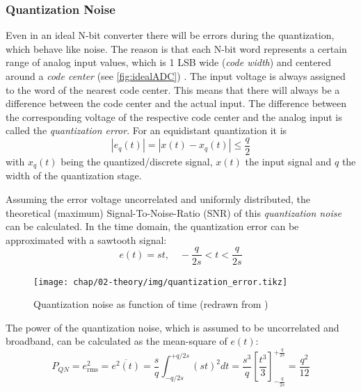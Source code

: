 \subsubsection{Quantization Noise}
Even in an ideal N-bit converter there will be errors during the quantization, which behave like noise. The reason is that each N-bit word represents a certain range of analog input values, which is 1 LSB wide (\textit{code width}) and centered around a \textit{code center} (see \autoref{fig:idealADC}) \cite{Lundberg}. The input voltage is always assigned to the word of the nearest code center. This means that there will always be a difference between the code center and the actual input. The difference between the corresponding voltage of the respective code center and the analog input is called the \textit{quantization error}. For an equidistant quantization it is
\begin{equation}
\left| e_q(t) \right| = \left| x(t) - x_q(t) \right| \leq \frac{q}{2}
\end{equation}
with $x_q(t)$ being the quantized/discrete signal, $x(t)$ the input signal and $q$ the width of the quantization stage. \cite{puente2015} 

Assuming the error voltage uncorrelated and uniformly distributed, the theoretical (maximum) Signal-To-Noise-Ratio (SNR) of this \textit{quantization noise} can be calculated. In the time domain, the quantization error can be approximated with a sawtooth signal:
\begin{equation}
e(t) = st, \quad -\frac{q}{2s} < t < \frac{q}{2s} 
\end{equation}
\begin{figure}[H]
	\centering
	\texttt{[image: chap/02-theory/img/quantization\_error.tikz]}
	\caption{Quantization noise as function of time (redrawn from \cite{walt})}
	\label{fig:eq}
\end{figure}

The power of the quantization noise, which is assumed to be uncorrelated and broadband, can be calculated as the mean-square of $e(t)$:
\begin{equation}
P_{QN} = e_{\text{rms}}^{2} = \overline{e^{2}(t)} = \frac{s}{q}\int_{-q/2s}^{+q/2s} (st)^{2} dt = \frac{s^3}{q} \left[ \frac{t^3}{3}\right]_{-\frac{q}{2s}}^{+\frac{q}{2s}} = \frac{q^2}{12}
\end{equation}

